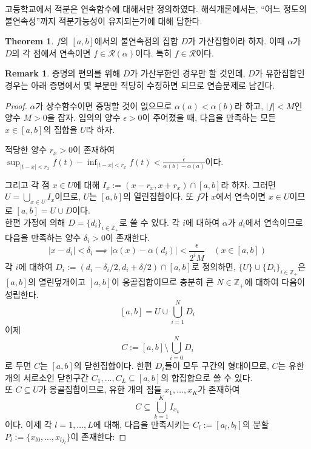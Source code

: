 \documentclass[11pt]{book}
\numberwithin{equation}{chapter}
\def\ZZ{\mathbb{Z}}
\def\eps{\epsilon}
\def\calR{\mathcal{R}}
\newcommand{\abs}[1]{\left\vert#1\right\vert}
\theoremstyle{definition}
\newtheorem{thm}{Theorem}[section]
\newtheorem*{rem}{Remark}
\begin{document}
고등학교에서 적분은 연속함수에 대해서만 정의하였다. 해석개론에서는, ``어느 정도의 불연속성''까지 적분가능성이 유지되는가에 대해 답한다.

\begin{thm}
    \(f\)의 \([a, b]\)에서의 불연속점의 집합 \(D\)가 가산집합이라 하자. 이때 \(\alpha\)가 \(D\)의 각 점에서 연속이면 \(f \in \calR(\alpha)\)이다. 특히 \(f \in \calR\)이다.
\end{thm}
\begin{rem}
    증명의 편의를 위해 \(D\)가 가산무한인 경우만 할 것인데, \(D\)가 유한집합인 경우는 아래 증명에서 몇 부분만 적당히 수정하면 되므로 연습문제로 남긴다.
\end{rem}
\begin{proof}
    \(\alpha\)가 상수함수이면 증명할 것이 없으므로 \(\alpha(a) < \alpha(b)\)라 하고, \(\abs{f} < M\)인 양수 \(M > 0\)을 잡자. 임의의 양수 \(\eps > 0\)이 주어졌을 때, 다음을 만족하는 모든 \(x \in [a, b]\)의 집합을 \(U\)라 하자.
    \begin{center}
        적당한 양수 \(r_x > 0\)이 존재하여 \(\displaystyle \sup_{\abs{t - x} < r_x} f(t) - \inf_{\abs{t - x} < r_x} f(t) < \frac{\eps}{\alpha(b) - \alpha(a)}\)이다.
    \end{center}
    그리고 각 점 \(x \in U\)에 대해 \(I_{x} := (x - r_x, x + r_x) \cap [a, b]\)라 하자. 그러면 \(U = \bigcup_{x \in U} I_x\)이므로, \(U\)는 \([a, b]\)의 열린집합이다. 또 \(f\)가 \(x\)에서 연속이면 \(x \in U\)이므로 \([a, b] = U \cup D\)이다.\\
    한편 가정에 의해 \(D = \{d_i\}_{i \in \ZZ_+}\)로 쓸 수 있다. 각 \(i\)에 대하여 \(\alpha\)가 \(d_i\)에서 연속이므로 다음을 만족하는 양수 \(\delta_i > 0\)이 존재한다.
    \[
        \abs{x - d_i} < \delta_i \implies \abs{\alpha(x) - \alpha(d_i)} < \frac{\eps}{2^i M} \quad (x \in [a, b])
    \]
    각 \(i\)에 대하여 \(D_i := (d_i - \delta_i/2, d_i + \delta/2) \cap [a, b]\)로 정의하면, \(\{U\} \cup \{D_i\}_{i \in \ZZ_+}\)은 \([a, b]\)의 열린덮개이고 \([a, b]\)이 옹골집합이므로 충분히 큰 \(N \in \ZZ_+\)에 대하여 다음이 성립한다.
    \[
        [a, b] = U \cup \bigcup_{i=1}^N D_i
    \]
    이제
    \[
        C := [a, b] \setminus \bigcup_{i=0}^N D_i
    \]
    로 두면 \(C\)는 \([a, b]\)의 닫힌집합이다. 한편 \(D_i\)들이 모두 구간의 형태이므로, \(C\)는 유한 개의 서로소인 닫힌구간 \(C_1, \ldots, C_L \subseteq [a, b]\)의 합집합으로 쓸 수 있다.\\
    또 \(C \subseteq U\)가 옹골집합이므로, 유한 개의 점들 \(x_1, \ldots, x_K\)가 존재하여
    \[
        C \subseteq \bigcup_{k=1}^K I_{x_k}
    \]
    이다. 이제 각 \(l = 1, \ldots, L\)에 대해, 다음을 만족시키는 \(C_l := [a_l, b_l]\)의 분할 \(P_l := \{x_{l0}, \ldots, x_{lj_l}\}\)이 존재한다:

\end{proof}
\end{document}
